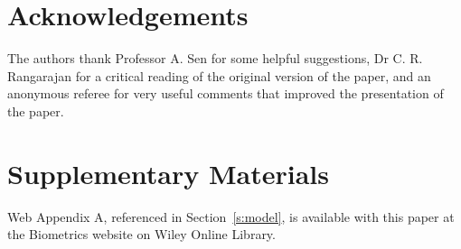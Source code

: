 \documentclass[useAMS,referee]{biom}
\begin{document}
\section*{Acknowledgements}

The authors thank Professor A. Sen for some helpful suggestions,
Dr C. R. Rangarajan for a critical reading of the original version of the
paper, and an anonymous referee for very useful comments that improved
the presentation of the paper.\vspace*{-8pt}


\section*{Supplementary Materials}

Web Appendix A, referenced in Section~\ref{s:model}, is available with
this paper at the Biometrics website on Wiley Online
Library.\vspace*{-8pt}


%
%   
% 
\end{document}

